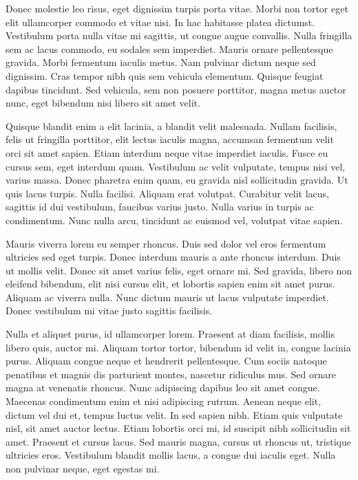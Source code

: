 \documentclass[2pt,a4paper,twoside ]{article}
\begin{document}
\begin{multicols}{2}
Donec molestie leo risus, eget dignissim turpis porta vitae. Morbi non tortor eget elit ullamcorper commodo et vitae nisi. In hac habitasse platea dictumst. Vestibulum porta nulla vitae mi sagittis, ut congue augue convallis. Nulla fringilla sem ac lacus commodo, eu sodales sem imperdiet. Mauris ornare pellentesque gravida. Morbi fermentum iaculis metus. Nam pulvinar dictum neque sed dignissim. Cras tempor nibh quis sem vehicula elementum. Quisque feugiat dapibus tincidunt. Sed vehicula, sem non posuere porttitor, magna metus auctor nunc, eget bibendum nisi libero sit amet velit.

Quisque blandit enim a elit lacinia, a blandit velit malesuada. Nullam facilisis, felis ut fringilla porttitor, elit lectus iaculis magna, accumsan fermentum velit orci sit amet sapien. Etiam interdum neque vitae imperdiet iaculis. Fusce eu cursus sem, eget interdum quam. Vestibulum ac velit vulputate, tempus nisi vel, varius massa. Donec pharetra enim quam, eu gravida nisl sollicitudin gravida. Ut quis lacus turpis. Nulla facilisi. Aliquam erat volutpat. Curabitur velit lacus, sagittis id dui vestibulum, faucibus varius justo. Nulla varius in turpis ac condimentum. Nunc nulla arcu, tincidunt ac euismod vel, volutpat vitae sapien.

Mauris viverra lorem eu semper rhoncus. Duis sed dolor vel eros fermentum ultricies sed eget turpis. Donec interdum mauris a ante rhoncus interdum. Duis ut mollis velit. Donec sit amet varius felis, eget ornare mi. Sed gravida, libero non eleifend bibendum, elit nisi cursus elit, et lobortis sapien enim sit amet purus. Aliquam ac viverra nulla. Nunc dictum mauris ut lacus vulputate imperdiet. Donec vestibulum mi vitae justo sagittis facilisis.

Nulla et aliquet purus, id ullamcorper lorem. Praesent at diam facilisis, mollis libero quis, auctor mi. Aliquam tortor tortor, bibendum id velit in, congue lacinia purus. Aliquam congue neque et hendrerit pellentesque. Cum sociis natoque penatibus et magnis dis parturient montes, nascetur ridiculus mus. Sed ornare magna at venenatis rhoncus. Nunc adipiscing dapibus leo sit amet congue. Maecenas condimentum enim et nisi adipiscing rutrum. Aenean neque elit, dictum vel dui et, tempus luctus velit. In sed sapien nibh. Etiam quis vulputate nisl, sit amet auctor lectus. Etiam lobortis orci mi, id suscipit nibh sollicitudin sit amet. Praesent et cursus lacus. Sed mauris magna, cursus ut rhoncus ut, tristique ultricies eros. Vestibulum blandit mollis lacus, a congue dui iaculis eget. Nulla non pulvinar neque, eget egestas mi.


\end{multicols}
\end{document}
